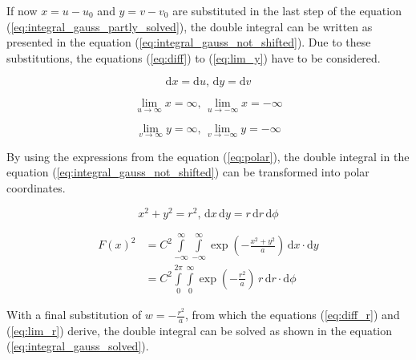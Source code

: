 If now $x = u - u_0$ and $y = v - v_0$ are substituted in the last step of the equation (\ref{eq:integral_gauss_partly_solved}), the double integral can be written as presented in the equation (\ref{eq:integral_gauss_not_shifted}). Due to these substitutions, the equations (\ref{eq:diff}) to (\ref{eq:lim_y}) have to be considered. 
\begin{center}
	\begin{equation} \label{eq:diff}
		\mathrm{d}x = \mathrm{d}u \text{, } \mathrm{d}y = \mathrm{d}v
	\end{equation}
\end{center}
\begin{center}
	\begin{equation} \label{eq:lim_x}
		\lim\limits_{u \to \infty} x = \infty \text{, } \lim\limits_{u \to -\infty} x = -\infty
	\end{equation}
\end{center}
\begin{center}
	\begin{equation} \label{eq:lim_y}
		\lim\limits_{v \to \infty} y = \infty \text{, } \lim\limits_{v \to -\infty} y = -\infty
	\end{equation}
\end{center}
By using the expressions from the equation (\ref{eq:polar}), the double integral in the equation (\ref{eq:integral_gauss_not_shifted}) can be transformed into polar coordinates.
\begin{center}
	\begin{equation} \label{eq:polar}
		x^2 + y^2 = r^2 \text{, } \mathrm{d}x \, \mathrm{d}y = r \, \mathrm{d}r \,\mathrm{d}\phi
	\end{equation}
\end{center}
\begin{center}
	\begin{equation} \label{eq:integral_gauss_not_shifted}
		\begin{aligned}
		F\left(x\right)^2 &= C^2 \int\limits_{-\infty}^{\infty} \int\limits_{-\infty}^{\infty} \exp\left(-\frac{x^2 + y^2}{a}\right) \,\mathrm{d}x \cdot \mathrm{d}y \\
		&= C^2 \int\limits_{0}^{2\pi} \int\limits_{0}^{\infty} \exp\left(-\frac{r^2}{a}\right) \, r \,\mathrm{d}r \cdot \mathrm{d}\phi
		\end{aligned}
	\end{equation}
\end{center}
With a final substitution of $w = -\frac{r^2}{a}$, from which the equations (\ref{eq:diff_r}) and (\ref{eq:lim_r}) derive, the double integral can be solved as shown in the equation (\ref{eq:integral_gauss_solved}).
